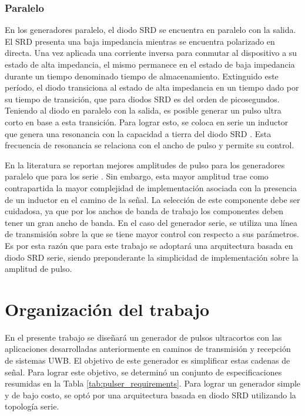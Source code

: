 \subsubsection{Paralelo}

En los generadores paralelo, el diodo SRD se encuentra en paralelo con la
salida. El SRD presenta una baja impedancia mientras se encuentra polarizado en
directa. Una vez aplicada una corriente inversa para conmutar al dispositivo a
su estado de alta impedancia, el mismo permanece en el estado de baja impedancia
durante un tiempo denominado tiempo de almacenamiento. Extinguido este período,
el diodo transiciona al estado de alta impedancia en un tiempo dado por su
tiempo de transición, que para diodos SRD es del orden de picosegundos. Teniendo
al diodo en paralelo con la salida, es posible generar un pulso ultra corto en
base a esta transición. Para lograr esto, se coloca en serie un inductor que
genera una resonancia con la capacidad a tierra del diodo SRD \cite{Hall1966}.
Esta frecuencia de resonancia se relaciona con el ancho de pulso y permite su
control.

En la literatura se reportan mejores amplitudes de pulso para los generadores
paralelo que para los serie \cite{han2005}. Sin embargo, esta mayor amplitud
trae como contrapartida la mayor complejidad de implementación asociada con la
presencia de un inductor en el camino de la señal. La selección de este
componente debe ser cuidadosa, ya que por los anchos de banda de trabajo los
componentes deben tener un gran ancho de banda. En el caso del generador serie,
se utiliza una línea de transmisión sobre la que se tiene mayor control con
respecto a sus parámetros. Es por esta razón que para este trabajo se adoptará
una arquitectura basada en diodo SRD serie, siendo preponderante la simplicidad
de implementación sobre la amplitud de pulso.


\section{Organización del trabajo}

En el presente trabajo se diseñará un generador de pulsos ultracortos con
las aplicaciones desarrolladas anteriormente en caminos de transmisión y
recepción de sistemas UWB. El objetivo de este generador es simplificar estas
cadenas de señal. Para lograr este objetivo, se determinó un conjunto de
especificaciones resumidas en la Tabla \ref{tab:pulser_requirements}. Para
lograr un generador simple y de bajo costo, se optó por una arquitectura basada
en diodo SRD utilizando la topología serie.

